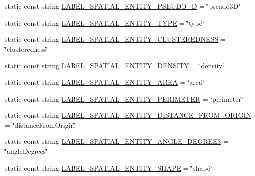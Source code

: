 \begin{DoxyCompactItemize}
\item 
static const string \hyperlink{classmultiscale_1_1analysis_1_1Detector_afc891454d41c2ede5e4b3155798045c4}{L\-A\-B\-E\-L\-\_\-\-S\-P\-A\-T\-I\-A\-L\-\_\-\-E\-N\-T\-I\-T\-Y\-\_\-\-P\-S\-E\-U\-D\-O\-\_\-D} = \char`\"{}pseudo3\-D\char`\"{}
\item 
static const string \hyperlink{classmultiscale_1_1analysis_1_1Detector_ac93f1fd6bdc7250b890480c7d5acf5b0}{L\-A\-B\-E\-L\-\_\-\-S\-P\-A\-T\-I\-A\-L\-\_\-\-E\-N\-T\-I\-T\-Y\-\_\-\-T\-Y\-P\-E} = \char`\"{}type\char`\"{}
\item 
static const string \hyperlink{classmultiscale_1_1analysis_1_1Detector_adae62b15a836592fd35057cf037730d8}{L\-A\-B\-E\-L\-\_\-\-S\-P\-A\-T\-I\-A\-L\-\_\-\-E\-N\-T\-I\-T\-Y\-\_\-\-C\-L\-U\-S\-T\-E\-R\-E\-D\-N\-E\-S\-S} = \char`\"{}clusteredness\char`\"{}
\item 
static const string \hyperlink{classmultiscale_1_1analysis_1_1Detector_ab4f91117dab09a9356422d839aba811f}{L\-A\-B\-E\-L\-\_\-\-S\-P\-A\-T\-I\-A\-L\-\_\-\-E\-N\-T\-I\-T\-Y\-\_\-\-D\-E\-N\-S\-I\-T\-Y} = \char`\"{}density\char`\"{}
\item 
static const string \hyperlink{classmultiscale_1_1analysis_1_1Detector_a163a0858c9d71d9ddac78f814d48bee6}{L\-A\-B\-E\-L\-\_\-\-S\-P\-A\-T\-I\-A\-L\-\_\-\-E\-N\-T\-I\-T\-Y\-\_\-\-A\-R\-E\-A} = \char`\"{}area\char`\"{}
\item 
static const string \hyperlink{classmultiscale_1_1analysis_1_1Detector_adc07a468da3a48acbb858c6a8de7dec2}{L\-A\-B\-E\-L\-\_\-\-S\-P\-A\-T\-I\-A\-L\-\_\-\-E\-N\-T\-I\-T\-Y\-\_\-\-P\-E\-R\-I\-M\-E\-T\-E\-R} = \char`\"{}perimeter\char`\"{}
\item 
static const string \hyperlink{classmultiscale_1_1analysis_1_1Detector_a58a41d2e2ccdbf3c760823d51ce9b0fe}{L\-A\-B\-E\-L\-\_\-\-S\-P\-A\-T\-I\-A\-L\-\_\-\-E\-N\-T\-I\-T\-Y\-\_\-\-D\-I\-S\-T\-A\-N\-C\-E\-\_\-\-F\-R\-O\-M\-\_\-\-O\-R\-I\-G\-I\-N} = \char`\"{}distance\-From\-Origin\char`\"{}
\item 
static const string \hyperlink{classmultiscale_1_1analysis_1_1Detector_a5cb6f0a78406631f55d4a1b11197652e}{L\-A\-B\-E\-L\-\_\-\-S\-P\-A\-T\-I\-A\-L\-\_\-\-E\-N\-T\-I\-T\-Y\-\_\-\-A\-N\-G\-L\-E\-\_\-\-D\-E\-G\-R\-E\-E\-S} = \char`\"{}angle\-Degrees\char`\"{}
\item 
static const string \hyperlink{classmultiscale_1_1analysis_1_1Detector_ae824ff121054358172ebf21aab8a8b46}{L\-A\-B\-E\-L\-\_\-\-S\-P\-A\-T\-I\-A\-L\-\_\-\-E\-N\-T\-I\-T\-Y\-\_\-\-S\-H\-A\-P\-E} = \char`\"{}shape\char`\"{}
\item 

\end{DoxyCompactItemize}
